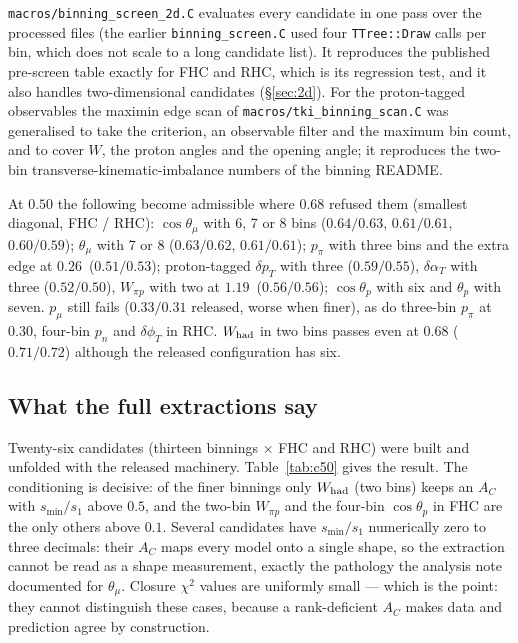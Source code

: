 \texttt{macros/binning\_screen\_2d.C} evaluates every candidate in one pass over the processed files
(the earlier \texttt{binning\_screen.C} used four \texttt{TTree::Draw} calls per bin, which does not
scale to a long candidate list). It reproduces the published pre-screen table exactly for FHC and RHC,
which is its regression test, and it also handles two-dimensional candidates
(\S\ref{sec:2d}). For the proton-tagged observables the maximin edge scan of
\texttt{macros/tki\_binning\_scan.C} was generalised to take the criterion, an observable filter and
the maximum bin count, and to cover $W$, the proton angles and the opening angle; it reproduces the
two-bin transverse-kinematic-imbalance numbers of the binning README.

At $0.50$ the following become admissible where $0.68$ refused them (smallest diagonal, FHC / RHC):
$\cos\theta_\mu$ with 6, 7 or 8 bins ($0.64/0.63$, $0.61/0.61$, $0.60/0.59$); $\theta_\mu$ with 7 or 8
($0.63/0.62$, $0.61/0.61$); $p_\pi$ with three bins and the extra edge at $0.26$\GeVcc\ ($0.51/0.53$);
proton-tagged $\delta p_T$ with three ($0.59/0.55$), $\delta\alpha_T$ with three ($0.52/0.50$),
$W_{\pi p}$ with two at $1.19$\GeVcc\ ($0.56/0.56$); $\cos\theta_p$ with six and $\theta_p$ with seven.
$p_\mu$ still fails ($0.33/0.31$ released, worse when finer), as do three-bin $p_\pi$ at $0.30$\GeVcc,
four-bin $p_n$ and $\delta\phi_T$ in RHC. $W_{\rm had}$ in two bins passes even at $0.68$
($0.71/0.72$) although the released configuration has six.

\subsection{What the full extractions say}

Twenty-six candidates (thirteen binnings $\times$ FHC and RHC) were built and unfolded with the
released machinery. Table~\ref{tab:c50} gives the result. The conditioning is decisive: of the finer
binnings only $W_{\rm had}$ (two bins) keeps an $A_C$ with $s_{\min}/s_1$ above $0.5$, and the
two-bin $W_{\pi p}$ and the four-bin $\cos\theta_p$ in FHC are the only others above $0.1$. Several
candidates have $s_{\min}/s_1$ numerically zero to three decimals: their $A_C$ maps every model onto
a single shape, so the extraction cannot be read as a shape measurement, exactly the pathology the
analysis note documented for $\theta_\mu$. Closure $\chi^2$ values are uniformly small --- which is
the point: they cannot distinguish these cases, because a rank-deficient $A_C$ makes data and
prediction agree by construction.

